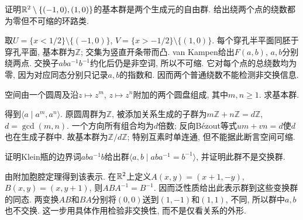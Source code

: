\begin{exercise}
证明$\mathbb R^2\setminus\{(-1,0),(1,0)\}$的基本群是两个生成元的自由群. 给出绕两个点的绕数都为零但不可缩的环路类.
\end{exercise}
\begin{solution}
取$U=\{x<1/2\}\setminus\{(-1,0)\}$, $V=\{x>-1/2\}\setminus\{(1,0)\}$. 每个穿孔半平面同胚于穿孔平面, 基本群为$\mathbb Z$; 交集为竖直开条带而凸. van Kampen给出$F(a,b)$, $a,b$分别绕两点. 交换子$aba^{-1}b^{-1}$约化后仍是非空词, 所以不可缩. 它对每个点的总绕数均为零, 因为对应同态分别只记录$a,b$的指数和. 因而两个普通绕数不能检测非交换信息.
\end{solution}
\begin{exercise}
空间由一个圆周及沿$z\mapsto z^m$, $z\mapsto z^n$附加的两个圆盘组成, 其中$m,n\ge1$. 求基本群.
\end{exercise}
\begin{solution}
得到$\langle a\mid a^m,a^n\rangle$. 原圆周群为$\mathbb Z$, 被添加关系生成的子群为$m\mathbb Z+n\mathbb Z=d\mathbb Z$, $d=\gcd(m,n)$. 一个方向所有组合均为$d$倍数; 反向B\'ezout等式$um+vn=d$使$d$也在生成子群中. 故基本群为$\mathbb Z/d\mathbb Z$; 特别互素时单连通, 但不能据此断言空间可缩.
\end{solution}
\begin{exercise}
证明Klein瓶的边界词$aba^{-1}b$给出群$\langle a,b\mid aba^{-1}=b^{-1}\rangle$, 并证明此群不是交换群.
\end{exercise}
\begin{solution}
由附加胞腔定理得到该表示. 在$\mathbb R^2$上定义$A(x,y)=(x+1,-y)$, $B(x,y)=(x,y+1)$, 则$ABA^{-1}=B^{-1}$. 因而泛性质给出此表示群到这些变换群的同态. 两变换$AB$和$BA$分别将$(0,0)$送到$(1,-1)$和$(1,1)$, 不同, 所以群中$a,b$也不交换. 这一步用具体作用检验非交换性, 而不是仅看关系的外形.
\end{solution}
